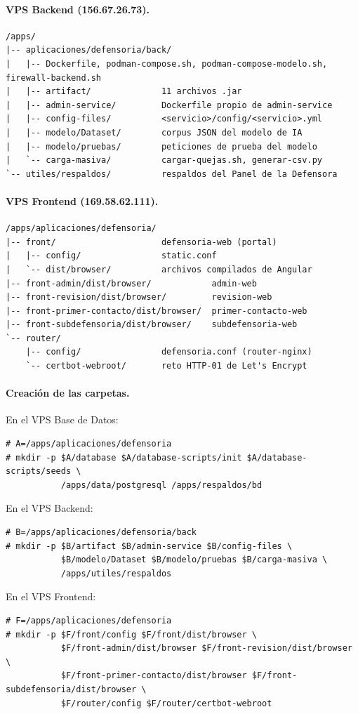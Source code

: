\paragraph{VPS Backend (156.67.26.73).}
\begin{lstlisting}
/apps/
|-- aplicaciones/defensoria/back/
|   |-- Dockerfile, podman-compose.sh, podman-compose-modelo.sh, firewall-backend.sh
|   |-- artifact/              11 archivos .jar
|   |-- admin-service/         Dockerfile propio de admin-service
|   |-- config-files/          <servicio>/config/<servicio>.yml
|   |-- modelo/Dataset/        corpus JSON del modelo de IA
|   |-- modelo/pruebas/        peticiones de prueba del modelo
|   `-- carga-masiva/          cargar-quejas.sh, generar-csv.py
`-- utiles/respaldos/          respaldos del Panel de la Defensora
\end{lstlisting}

\paragraph{VPS Frontend (169.58.62.111).}
\begin{lstlisting}
/apps/aplicaciones/defensoria/
|-- front/                     defensoria-web (portal)
|   |-- config/                static.conf
|   `-- dist/browser/          archivos compilados de Angular
|-- front-admin/dist/browser/            admin-web
|-- front-revision/dist/browser/         revision-web
|-- front-primer-contacto/dist/browser/  primer-contacto-web
|-- front-subdefensoria/dist/browser/    subdefensoria-web
`-- router/
    |-- config/                defensoria.conf (router-nginx)
    `-- certbot-webroot/       reto HTTP-01 de Let's Encrypt
\end{lstlisting}

\paragraph{Creación de las carpetas.} En el VPS Base de Datos:
\begin{lstlisting}
# A=/apps/aplicaciones/defensoria
# mkdir -p $A/database $A/database-scripts/init $A/database-scripts/seeds \
           /apps/data/postgresql /apps/respaldos/bd
\end{lstlisting}
En el VPS Backend:
\begin{lstlisting}
# B=/apps/aplicaciones/defensoria/back
# mkdir -p $B/artifact $B/admin-service $B/config-files \
           $B/modelo/Dataset $B/modelo/pruebas $B/carga-masiva \
           /apps/utiles/respaldos
\end{lstlisting}
En el VPS Frontend:
\begin{lstlisting}
# F=/apps/aplicaciones/defensoria
# mkdir -p $F/front/config $F/front/dist/browser \
           $F/front-admin/dist/browser $F/front-revision/dist/browser \
           $F/front-primer-contacto/dist/browser $F/front-subdefensoria/dist/browser \
           $F/router/config $F/router/certbot-webroot
\end{lstlisting}

